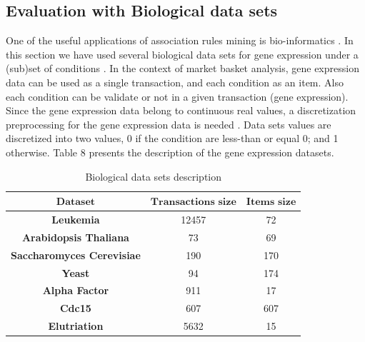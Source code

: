 \documentclass[preprint,12pt]{elsarticle}
\begin{document}
\subsection{ Evaluation with Biological data sets}
One of the useful applications of association rules mining is bio-informatics \cite{31}. 
In this section we have used several biological data sets for gene expression under a (sub)set of 
conditions \cite{32,29}. In the context of market basket analysis, gene expression data can be used as a single transaction, 
and each condition as an item.  Also each condition can be validate or not in a given transaction (gene expression).  
Since the gene expression data belong to continuous real values, a discretization preprocessing for the gene expression data is needed \cite{33}.
 Data sets values are discretized into two values, 0 if the condition are less-than or equal 0; and 1 otherwise. Table 8 presents the description of the gene expression datasets.
\begin{table}
\small
\caption{Biological data sets description}
\begin{center}
\begin{tabular}{c c c}
\toprule
$\textbf{Dataset}$&$\textbf{Transactions size}$&$\textbf{Items size}$\\\hline
\textbf{Leukemia}&	12457&	72 \\\hline
\textbf{Arabidopsis Thaliana}&	73&	69\\\hline
\textbf{Saccharomyces Cerevisiae}&	190&	170\\\hline
\textbf{Yeast}&	94&	174\\\hline
\textbf{Alpha Factor}&	911&	17\\\hline
\textbf{Cdc15}&	607&	607\\\hline
\textbf{Elutriation}&	5632&	15\\\hline
\bottomrule
\end{tabular}
\end{center}
\end{table}
\end{document}
